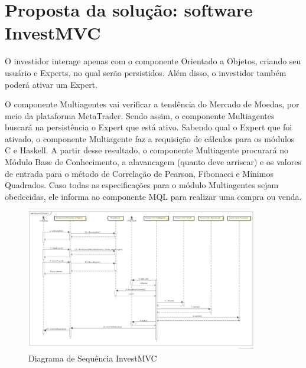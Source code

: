 \chapter{Proposta da solução: software InvestMVC}

O investidor interage apenas com o componente Orientado a Objetos, criando seu usuário e Experts, no qual serão persistidos. Além disso, o investidor também poderá ativar um Expert.

O componente Multiagentes vai verificar a tendência do Mercado de Moedas, por meio da plataforma MetaTrader. Sendo assim, o componente Multiagentes buscará na persistência o Expert que está ativo. Sabendo qual o Expert que foi ativado, o componente Multiagente faz a requisição de cálculos para os módulos C e Haskell. A partir desse resultado, o componente Multiagente procurará no Módulo Base de Conhecimento, a alavancagem (quanto deve arriscar) e os valores de entrada para o método de Correlação de Pearson, Fibonacci e Mínimos Quadrados. Caso todas as especificações para o módulo Multiagentes sejam obedecidas, ele informa ao componente MQL para realizar uma compra ou venda.

\begin{figure}[H]
\centering
\includegraphics[width=0.9\textwidth]{figuras/sequencia}
\caption{Diagrama de Sequência InvestMVC} 
\label{sequencia}
\end{figure}
